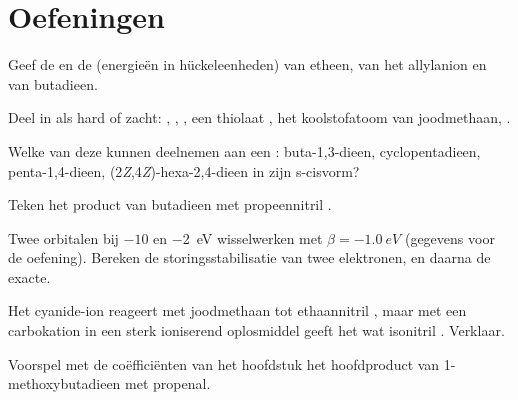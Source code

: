 \section{Oefeningen}

\begin{exercise}[$\star$]\label{exo:b2:frontier-orbitals:1}
Geef de  en de  (energieën in hückeleenheden) van etheen, van het allylanion
en van butadieen.
\end{exercise}

\begin{exercise}[$\star$]\label{exo:b2:frontier-orbitals:2}
Deel in als hard of zacht: , , , een thiolaat , het koolstofatoom van
joodmethaan, .
\end{exercise}

\begin{exercise}[$\star$]\label{exo:b2:frontier-orbitals:3}
Welke van deze  kunnen deelnemen aan een : buta-1,3-dieen,
cyclopentadieen, penta-1,4-dieen, (2\textit{Z},4\textit{Z})-hexa-2,4-dieen in zijn
s-cisvorm?
\end{exercise}

\begin{exercise}[$\star$]\label{exo:b2:frontier-orbitals:4}
Teken het product van butadieen met propeennitril .
\end{exercise}

\begin{exercise}[$\star\star$]\label{exo:b2:frontier-orbitals:5}
Twee orbitalen bij $-10$ en \qty{-2}{eV} wisselwerken met $\beta = \qty{-1.0}{eV}$ (gegevens voor de oefening).
Bereken de storingsstabilisatie van twee elektronen, en daarna de exacte.
\end{exercise}

\begin{exercise}[$\star\star$]\label{exo:b2:frontier-orbitals:6}
Het cyanide-ion reageert met joodmethaan tot ethaannitril , maar met een
carbokation in een sterk ioniserend oplosmiddel geeft het wat isonitril . Verklaar.
\end{exercise}

\begin{exercise}[$\star\star$]\label{exo:b2:frontier-orbitals:7}
Voorspel met de coëfficiënten van het hoofdstuk het hoofdproduct van 1-methoxybutadieen
met propenal.
\end{exercise}

